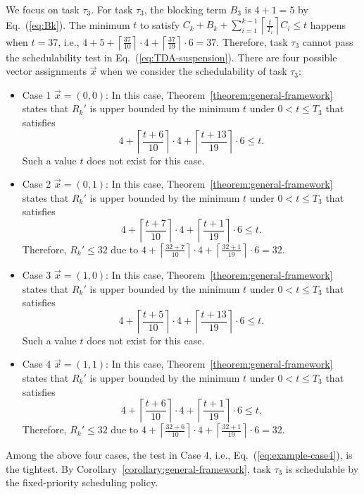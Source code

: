\documentclass[10pt,conference]{IEEEtran}
\newcommand{\ceiling}[1]{\left\lceil{#1}\right\rceil}
\begin{document}
We focus on task $\tau_3$.  
For task $\tau_3$, the blocking term $B_3$ is $4+1=5$ by
Eq.~(\ref{eq:Bk}). The minimum $t$ to satisfy $C_k + B_k +
\sum_{i=1}^{k-1}\ceiling{\frac{t}{T_i}} C_i \leq t$ happens when $t=37$, i.e., $4+5+\ceiling{\frac{37}{10}}\cdot 4+\ceiling{\frac{37}{19}}\cdot 6=37$. Therefore, task $\tau_3$ cannot pass the schedulability test in Eq.~(\ref{eq:TDA-suspension}).
There are four
possible vector assignments $\vec{x}$ when we consider the schedulability of task $\tau_3$:
\begin{itemize}
\item Case 1 $\vec{x} = (0 , 0)$: In this case, Theorem~\ref{theorem:general-framework} states that $R_k'$ is upper bounded by the minimum $t$ under $0 < t \leq T_3$ that
   satisfies 
   {\small \begin{equation}\label{eq:example-case1} 
       4+ \ceiling{\frac{t+6}{10}}\cdot 4 + \ceiling{\frac{t+13}{19}}\cdot 6 \leq t.
     \end{equation}}Such a value $t$ does not exist for this case.
\item Case 2 $\vec{x} = (0 , 1)$:
 In this case, Theorem~\ref{theorem:general-framework} states that $R_k'$ is upper bounded by  the minimum $t$
under $0 < t \leq T_3$ that
   satisfies 
   {\small \begin{equation}\label{eq:example-case2} 
       4+ \ceiling{\frac{t+7}{10}}\cdot 4 + \ceiling{\frac{t+1}{19}}\cdot 6 \leq t.
     \end{equation}}Therefore, $R_k' \leq 32$ due to $4+ \ceiling{\frac{32+7}{10}}\cdot 4 + \ceiling{\frac{32+1}{19}}\cdot 6=32$.
\item Case 3 $\vec{x} = (1 , 0)$:
 In this case, Theorem~\ref{theorem:general-framework} states that $R_k'$ is upper bounded by  the minimum $t$
under $0 < t \leq T_3$ that
   satisfies 
   {\small \begin{equation}\label{eq:example-case3} 
       4+ \ceiling{\frac{t+5}{10}}\cdot 4 + \ceiling{\frac{t+13}{19}}\cdot 6 \leq t.
     \end{equation}}Such a value $t$ does not exist for this case.
\item Case 4 $\vec{x} = (1 , 1)$:
 In this case, Theorem~\ref{theorem:general-framework} states that $R_k'$ is upper bounded by  the minimum $t$
under $0 < t \leq T_3$ that
   satisfies 
   {\small \begin{equation}\label{eq:example-case4} 
       4+ \ceiling{\frac{t+6}{10}}\cdot 4 + \ceiling{\frac{t+1}{19}}\cdot 6 \leq t.
     \end{equation}}Therefore, $R_k' \leq 32$ due to $4+ \ceiling{\frac{32+6}{10}}\cdot 4 + \ceiling{\frac{32+1}{19}}\cdot 6=32$.
\end{itemize}
Among the above four cases, the test in Case 4, i.e.,
Eq.~(\ref{eq:example-case4}), is the tightest. By
Corollary~\ref{corollary:general-framework}, task $\tau_3$ is
schedulable by the fixed-priority scheduling policy.
\end{document}

